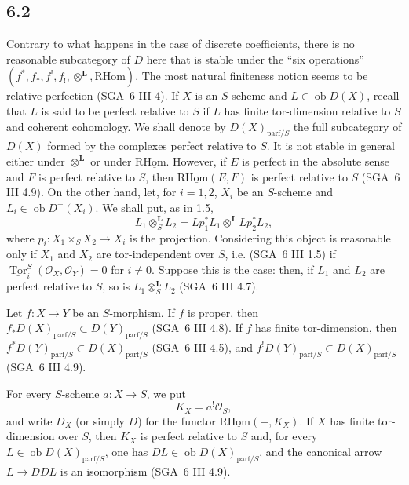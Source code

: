 \documentclass[11pt]{article}
\providecommand{\cO}{\mathcal{O}}
\DeclareMathOperator{\Tor}{Tor}
\begin{document}
\subsection*{6.2}
Contrary to what happens in the case of discrete coefficients, there is no reasonable subcategory of $D$ here that is stable under the ``six operations'' $(f^*,f_*,f^!,f_!,\otimes^{\mathbf L},\mathrm{R}\underline{\mathrm{Hom}})$. The most natural finiteness notion seems to be relative perfection (SGA~6 III 4). If $X$ is an $S$-scheme and $L\in\operatorname{ob}D(X)$, recall that $L$ is said to be perfect relative to $S$ if $L$ has finite tor-dimension relative to $S$ and coherent cohomology. We shall denote by $D(X)_{\mathrm{parf}/S}$ the full subcategory of $D(X)$ formed by the complexes perfect relative to $S$. It is not stable in general either under $\otimes^{\mathbf L}$ or under $\mathrm{R}\underline{\mathrm{Hom}}$. However, if $E$ is perfect in the absolute sense and $F$ is perfect relative to $S$, then $\mathrm{R}\underline{\mathrm{Hom}}(E,F)$ is perfect relative to $S$ (SGA~6 III 4.9). On the other hand, let, for $i=1,2$, $X_i$ be an $S$-scheme and $L_i\in\operatorname{ob}D^{-}(X_i)$. We shall put, as in 1.5,
\[
L_1\otimes_S^{\mathbf L}L_2=Lp_1^*L_1\otimes^{\mathbf L}Lp_2^*L_2,
\]
where $p_i:X_1\times_SX_2\to X_i$ is the projection. Considering this object is reasonable only if $X_1$ and $X_2$ are tor-independent over $S$, i.e. (SGA~6 III 1.5) if $\underline{\Tor}_i^S(\cO_X,\cO_Y)=0$ for $i\ne0$. Suppose this is the case: then, if $L_1$ and $L_2$ are perfect relative to $S$, so is $L_1\otimes_S^{\mathbf L}L_2$ (SGA~6 III 4.7).

Let $f:X\to Y$ be an $S$-morphism. If $f$ is proper, then $f_*D(X)_{\mathrm{parf}/S}\subset D(Y)_{\mathrm{parf}/S}$ (SGA~6 III 4.8). If $f$ has finite tor-dimension, then $f^*D(Y)_{\mathrm{parf}/S}\subset D(X)_{\mathrm{parf}/S}$ (SGA~6 III 4.5), and $f^!D(Y)_{\mathrm{parf}/S}\subset D(X)_{\mathrm{parf}/S}$ (SGA~6 III 4.9).

For every $S$-scheme $a:X\to S$, we put
\begin{equation}
\tag{6.2.1}
K_X=a^!\cO_S,
\end{equation}
and write $D_X$ (or simply $D$) for the functor $\mathrm{R}\underline{\mathrm{Hom}}(-,K_X)$. If $X$ has finite tor-dimension over $S$, then $K_X$ is perfect relative to $S$ and, for every $L\in\operatorname{ob}D(X)_{\mathrm{parf}/S}$, one has $DL\in\operatorname{ob}D(X)_{\mathrm{parf}/S}$, and the canonical arrow $L\to DDL$ is an isomorphism (SGA~6 III 4.9).
\end{document}
